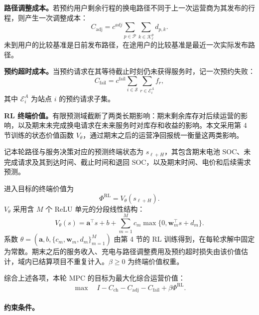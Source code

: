 \documentclass[12pt,a4paper,UTF8]{ctexart}
\begin{document}
\textbf{路径调整成本。}若预约用户剩余行程的换电路径不同于上一次运营商为其发布的行程，则产生一次调整成本：
\begin{equation}
C_{\mathrm{adj}}
=
c^{adj}
\sum_{p\in\mathcal P}
\sum_{k\in\mathcal K_\ell^p}
d_{p,k}.
\label{eq:adjustment_cost}
\end{equation}
未到用户的比较基准是日前发布路径，在途用户的比较基准是最近一次实际发布路径。

\textbf{预约超时成本。}当预约请求在其等待截止时刻仍未获得服务时，记一次预约失败：
\begin{equation}
C_{\mathrm{fail}}
=
c^{\mathrm{fail}}
\sum_{i\in\mathcal S}
\sum_{r\in\mathcal E_{i}^{A}}
f_r,
\label{eq:reservation_failure_cost}
\end{equation}
其中 $\mathcal E_i^A$ 为站点 $i$ 的预约请求子集。

\textbf{RL 终端价值。}有限预测域截断了两类长期影响：期末剩余库存对后续运营的影响，以及期末未完成换电请求在未来服务时对库存和收益的影响。本文采用第 4 节训练的状态价值函数 $V_\theta$，通过期末之后的运营净回报统一衡量这两类影响。

记本轮路径与服务决策对应的预测终端状态为 $s_{\ell+H}$，其包含期末电池 SOC、未完成请求及其到达时间、截止时间和退回 SOC，以及期末时间、电价和后续需求预测。

进入目标的终端价值为
\begin{equation}
\Phi^{\mathrm{RL}}
=V_\theta\!\left(s_{\ell+H}\right).
\label{eq:rl_terminal_value}
\end{equation}
$V_\theta$ 采用含 $M$ 个 ReLU 单元的分段线性结构：
\begin{equation}
V_\theta(s)
=\boldsymbol a^\top s+b
+\sum_{m=1}^{M}c_m
\max\{0,\boldsymbol w_m^\top s+d_m\}.
\label{eq:pwl_critic}
\end{equation}
系数 $\theta=(\boldsymbol a,b,\{c_m,\boldsymbol w_m,d_m\}_{m=1}^{M})$ 由第 4 节的 RL 训练得到，在每轮求解中固定为常数。期末之后的服务收入、充电与路径调整费用及预约超时损失由该价值估计，域内已结算项目不重复计入。$\beta\ge0$ 为终端价值权重。

综合上述各项，本轮 MPC 的目标为最大化综合运营价值：
\begin{equation}
\max\quad
I-C_{\mathrm{ch}}-C_{\mathrm{adj}}-C_{\mathrm{fail}}
+\beta\Phi^{\mathrm{RL}}.
\label{eq:objective}
\end{equation}


\paragraph{约束条件。}
\end{document}
